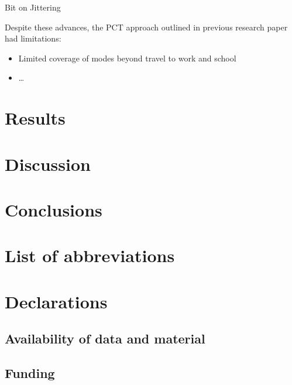 \documentclass[
  super,
  preprint,
  3p]{elsarticle}
\begin{document}
Bit on Jittering \citep{lovelace2022}

Despite these advances, the PCT approach outlined in previous research
paper had limitations:

\begin{itemize}
\item
  Limited coverage of modes beyond travel to work and school
\item
  \ldots{}
\end{itemize}

\hypertarget{results}{%
\section{Results}\label{results}}

\hypertarget{discussion}{%
\section{Discussion}\label{discussion}}

\hypertarget{conclusions}{%
\section{Conclusions}\label{conclusions}}

\hypertarget{list-of-abbreviations}{%
\section{List of abbreviations}\label{list-of-abbreviations}}

\hypertarget{declarations}{%
\section{Declarations}\label{declarations}}

\hypertarget{availability-of-data-and-material}{%
\subsection*{Availability of data and
material}\label{availability-of-data-and-material}}

\hypertarget{funding}{%
\subsection*{Funding}\label{funding}}
\end{document}
